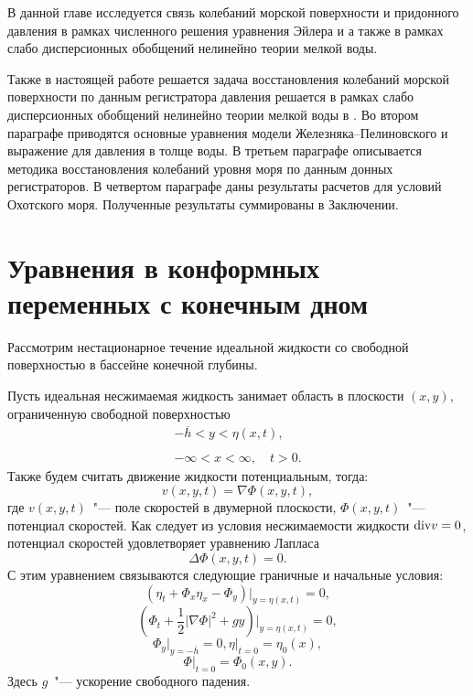 В данной главе исследуется связь колебаний морской поверхности и придонного давления в рамках численного решения уравнения Эйлера и а также в рамках слабо дисперсионных обобщений нелинейно теории мелкой воды.

Также в настоящей работе решается задача восстановления колебаний морской поверхности по данным регистратора давления решается в рамках слабо дисперсионных обобщений нелинейно теории мелкой воды в \cite{Green_1976}\cite{Zhel_Pel_1985} \cite{Fedotova_2008} \cite{Fedotova_2012}. Во втором параграфе приводятся основные уравнения модели Железняка--Пелиновского и выражение для давления в толще воды. В третьем параграфе описывается методика восстановления колебаний уровня моря по данным донных регистраторов. В четвертом параграфе даны результаты расчетов для условий Охотского моря. Полученные результаты суммированы в Заключении.




\section{Уравнения в конформных переменных с конечным дном}\label{sect3_1}
Рассмотрим нестационарное течение идеальной жидкости со свободной поверхностью в бассейне конечной глубины.

Пусть идеальная несжимаемая жидкость занимает область в плоскости $(x,y),$ ограниченную свободной поверхностью
\begin{gather*}
-\overline h<y<\eta(x,t),
\\
\\
-\infty<x<\infty,\quad t>0.
\end{gather*}
Также будем считать движение жидкости потенциальным, тогда:
$$
v(x,y,t)=\nabla\Phi(x,y,t),
$$
где $v(x,y,t)$~"--- поле скоростей в двумерной плоскости, $\Phi(x,y,t)$~"---
потенциал скоростей. Как следует из условия несжимаемости жидкости ${\rm div} v=0$, потенциал скоростей удовлетворяет уравнению Лапласа
$$
\Delta\Phi(x,y,t)=0.
$$
С этим уравнением связываются следующие граничные и начальные условия:
$$
(\eta_t+\Phi_x\eta_x-\Phi_y){|_{y=\eta(x,t)}}=0,
$$
$$
\left(\Phi_t+\dfrac{1}{2}|\nabla\Phi|^2+gy\right){|_{y=\eta(x,t)}}=0,
$$
$$
{\Phi_y}{|_{y=-\overline h}}=0, \eta{|_{t=0}}=\eta_0(x),
$$
$$
\Phi{|_{t=0}}=\Phi_0(x,y).
$$
Здесь $g$~"--- ускорение свободного падения.

